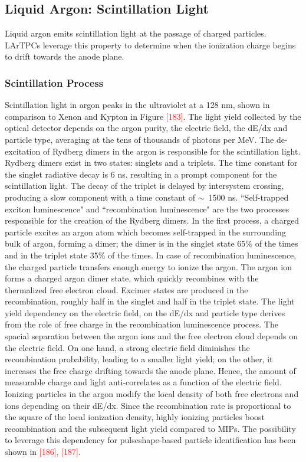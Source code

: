 \subsection{Liquid Argon: Scintillation Light }\label{sec:light}
Liquid argon emits scintillation light at the passage of charged particles. LArTPCs  leverage this property to determine when the ionization charge begins to drift towards the anode plane. %

\subsubsection{Scintillation Process}
Scintillation light in argon peaks in the ultraviolet at a 128 nm, shown in comparison to Xenon and Kypton in Figure  \textcolor{red}{[183]}. The light yield collected by the optical detector depends on the argon purity, the electric field, the dE/dx and particle type, averaging at the tens of thousands of photons per MeV. 
The de-excitation of Rydberg dimers in the argon is responsible for the scintillation light. 
Rydberg dimers exist in two states:  singlets and a triplets. The time constant for the singlet radiative decay is 6 ns, resulting in a prompt component for the scintillation light. The decay of the triplet is delayed by intersystem crossing, producing a slow component with a time constant of $\sim$~1500 ns.  ``Self-trapped exciton luminescence" and  ``recombination luminescence" are the two processes responsible for the creation of the Rydberg dimers. In the first process, a charged particle excites an argon atom which becomes self-trapped in the surrounding bulk of argon,  forming a dimer; the dimer is in the singlet state 65\% of the times and in the triplet state 35\% of the times. In case of recombination luminescence, the charged particle transfers enough energy to ionize the argon. The argon ion forms a charged argon dimer state, which quickly recombines with the thermalized free electron cloud. Excimer states are produced in the recombination, roughly half in the singlet and half in the triplet state. The light yield dependency on the electric field, on the dE/dx and particle type derives from the role of free charge in the recombination luminescence process. The spacial separation between the argon ions and the free electron cloud depends on the electric field. On one hand, a strong electric field diminishes the recombination probability, leading to a smaller light yield; on the other, it increases the free charge drifting towards the anode plane. Hence, the amount of  measurable charge and light anti-correlates as a function of the electric field.  Ionizing particles in the argon modify the local density of both free electrons and ions depending on their dE/dx. Since the recombination rate is proportional to the square of the local ionization density, highly ionizing particles boost recombination and the subsequent light yield compared to MIPs.  The possibility to leverage this dependency for pulseshape-based particle identification has been shown in \textcolor{red}{[186], [187]}.

